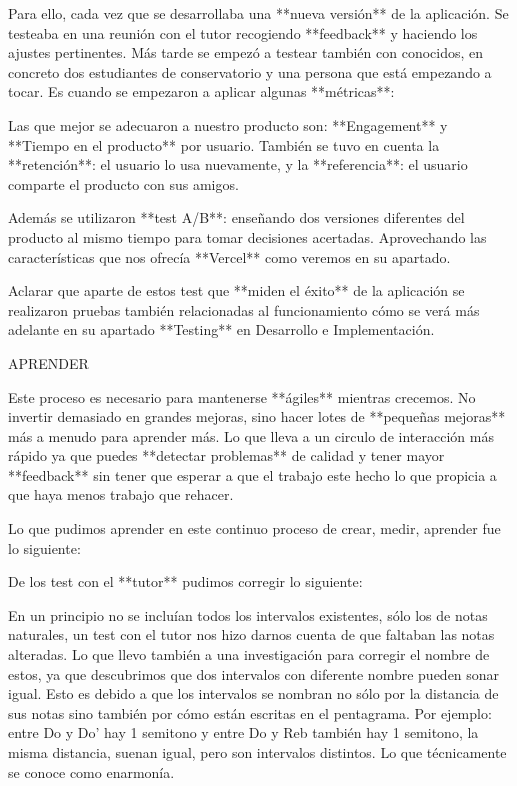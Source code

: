 \documentclass[12pt,twoside,titlepage]{report}
\begin{document}
Para ello, cada vez que se desarrollaba una **nueva versión** de la aplicación. Se testeaba en una reunión con el tutor recogiendo **feedback** y haciendo los ajustes pertinentes. Más tarde se empezó a testear también con conocidos, en concreto dos estudiantes de conservatorio y una persona que está empezando a tocar. Es cuando se empezaron a aplicar algunas **métricas**:

Las que mejor se adecuaron a nuestro producto son: **Engagement** y **Tiempo en el producto** por usuario. También se tuvo en cuenta la **retención**: el usuario lo usa nuevamente, y la **referencia**: el usuario comparte el producto con sus amigos.

Además se utilizaron **test A/B**: enseñando dos versiones diferentes del producto al mismo tiempo para tomar decisiones acertadas. Aprovechando las características que nos ofrecía **Vercel** como veremos en su apartado.

Aclarar que aparte de estos test que **miden el éxito** de la aplicación se realizaron pruebas también relacionadas al funcionamiento cómo se verá más adelante en su apartado **Testing** en Desarrollo e Implementación.

APRENDER

Este proceso es necesario para mantenerse **ágiles** mientras crecemos. No invertir demasiado en grandes mejoras, sino hacer lotes de **pequeñas mejoras** más a menudo para aprender más. Lo que lleva a un circulo de interacción más rápido ya que puedes **detectar problemas** de calidad y tener mayor **feedback** sin tener que esperar a que el trabajo este hecho lo que propicia a que haya menos trabajo que rehacer.

Lo que pudimos aprender en este continuo proceso de crear, medir, aprender fue lo siguiente:

De los test con el **tutor** pudimos corregir lo siguiente:

En un principio no se incluían todos los intervalos existentes, sólo los de notas naturales, un test con el tutor nos hizo darnos cuenta de que faltaban las notas alteradas. Lo que llevo también a una investigación para corregir el nombre de estos, ya que descubrimos que dos intervalos con diferente nombre pueden sonar igual. Esto es debido a que los intervalos se nombran no sólo por la distancia de sus notas sino también por cómo están escritas en el pentagrama. Por ejemplo: entre Do y Do' hay 1 semitono y entre Do y Reb también hay 1 semitono, la misma distancia, suenan igual, pero son intervalos distintos. Lo que técnicamente se conoce como enarmonía.
\end{document}
